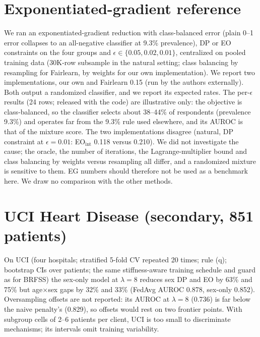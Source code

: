\begin{table}[h]
\centering
\caption{Production schedule vs.\ half learning rate / double rounds (unguarded): mean absolute difference in AUROC, DP$_\text{int}$, EO$_\text{int}$; $n$ = settings; last column: largest EO difference.}
\label{tab:conv}
\scriptsize
\setlength{\tabcolsep}{3pt}
\resizebox{\columnwidth}{!}{}
\end{table}

\section{Exponentiated-gradient reference}
\label{app:eg}
We ran an exponentiated-gradient reduction \cite{agarwal2018} with class-balanced error (plain 0--1 error collapses to an all-negative classifier at 9.3\% prevalence), DP or EO constraints on the four groups and $\epsilon\in\{0.05,0.02,0.01\}$, centralized on pooled training data (30K-row subsample in the natural setting; class balancing by resampling for Fairlearn, by weights for our own implementation). We report two implementations, our own and Fairlearn 0.15 (run by the authors externally). Both output a randomized classifier, and we report its expected rates. The per-$\epsilon$ results (24 rows; released with the code) are illustrative only: the objective is class-balanced, so the classifier selects about 38--44\% of respondents (prevalence 9.3\%) and operates far from the 9.3\% rule used elsewhere, and its AUROC is that of the mixture score. The two implementations disagree (natural, DP constraint at $\epsilon{=}0.01$: EO$_\text{int}$ 0.118 versus 0.210). We did not investigate the cause; the oracle, the number of iterations, the Lagrange-multiplier bound and class balancing by weights versus resampling all differ, and a randomized mixture is sensitive to them. EG numbers should therefore not be used as a benchmark here. We draw no comparison with the other methods.


\section{UCI Heart Disease (secondary, 851 patients)}
\label{app:uci}
On UCI (four hospitals; stratified 5-fold CV repeated 20 times; rule (q); bootstrap CIs over patients; the same stiffness-aware training schedule and guard as for BRFSS) the sex-only model at $\lambda{=}8$ reduces sex DP and EO by 63\% and 75\% but age$\times$sex gaps by 32\% and 33\% (FedAvg AUROC 0.878, sex-only 0.852). Oversampling offsets are not reported: its AUROC at $\lambda{=}8$ (0.736) is far below the naive penalty's (0.829), so offsets would rest on two frontier points. With subgroup cells of 2--6 patients per client, UCI is too small to discriminate mechanisms; its intervals omit training variability.

